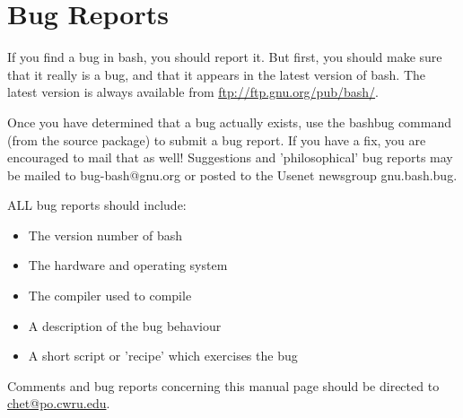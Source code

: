 \section{Bug Reports}\label{sec:bugreports}
    If you find a bug in bash, you should report it. But first, you should make sure that it really is a bug, and that it appears in the latest version of bash. The latest version is always available from \url{ftp://ftp.gnu.org/pub/bash/}.
    
    Once you have determined that a bug actually exists, use the bashbug command (from the source package) to submit a bug report. If you have a fix, you are encouraged to mail that as well! Suggestions and 'philosophical' bug reports may be mailed to bug-bash@gnu.org or posted to the Usenet newsgroup gnu.bash.bug.
    
    ALL bug reports should include:
    \begin{itemize}
        \item  The version number of bash
        \item  The hardware and operating system
        \item  The compiler used to compile
        \item  A description of the bug behaviour
        \item  A short script or 'recipe' which exercises the bug
    \end{itemize}
    Comments and bug reports concerning this manual page should be directed to \url{chet@po.cwru.edu}.